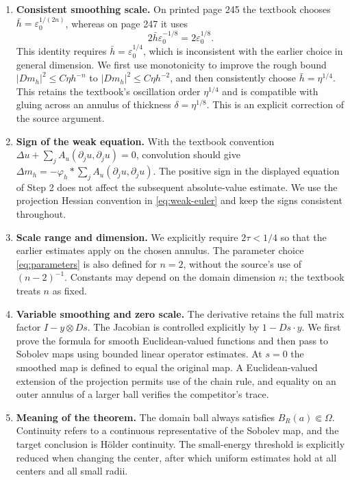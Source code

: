 \documentclass[11pt,a4paper]{article}
\numberwithin{equation}{section}
\theoremstyle{definition}
\begin{document}
\begin{enumerate}[leftmargin=*]
\item \textbf{Consistent smoothing scale.} On printed page 245 the textbook chooses $\bar h=\varepsilon_0^{1/(2n)}$, whereas on page 247 it uses
\[
2\bar h\varepsilon_0^{-1/8}=2\varepsilon_0^{1/8}.
\]
This identity requires $\bar h=\varepsilon_0^{1/4}$, which is inconsistent with the earlier choice in general dimension. We first use monotonicity to improve the rough bound $|Dm_h|^2\le C\eta h^{-n}$ to $|Dm_h|^2\le C\eta h^{-2}$, and then consistently choose $\bar h=\eta^{1/4}$. This retains the textbook's oscillation order $\eta^{1/4}$ and is compatible with gluing across an annulus of thickness $\delta=\eta^{1/8}$. This is an explicit correction of the source argument.
\item \textbf{Sign of the weak equation.} With the textbook convention $\Delta u+\sum_jA_u(\partial_ju,\partial_ju)=0$, convolution should give $\Delta m_h=-\varphi_h*\sum_jA_u(\partial_ju,\partial_ju)$. The positive sign in the displayed equation of Step 2 does not affect the subsequent absolute-value estimate. We use the projection Hessian convention in \eqref{eq:weak-euler} and keep the signs consistent throughout.
\item \textbf{Scale range and dimension.} We explicitly require $2\tau<1/4$ so that the earlier estimates apply on the chosen annulus. The parameter choice \eqref{eq:parameters} is also defined for $n=2$, without the source's use of $(n-2)^{-1}$. Constants may depend on the domain dimension $n$; the textbook treats $n$ as fixed.
\item \textbf{Variable smoothing and zero scale.} The derivative retains the full matrix factor $I-y\otimes Ds$. The Jacobian is controlled explicitly by $1-Ds\cdot y$. We first prove the formula for smooth Euclidean-valued functions and then pass to Sobolev maps using bounded linear operator estimates. At $s=0$ the smoothed map is defined to equal the original map. A Euclidean-valued extension of the projection permits use of the chain rule, and equality on an outer annulus of a larger ball verifies the competitor's trace.
\item \textbf{Meaning of the theorem.} The domain ball always satisfies $B_R(a)\Subset\Omega$. Continuity refers to a continuous representative of the Sobolev map, and the target conclusion is Hölder continuity. The small-energy threshold is explicitly reduced when changing the center, after which uniform estimates hold at all centers and all small radii.
\end{enumerate}
\end{document}
